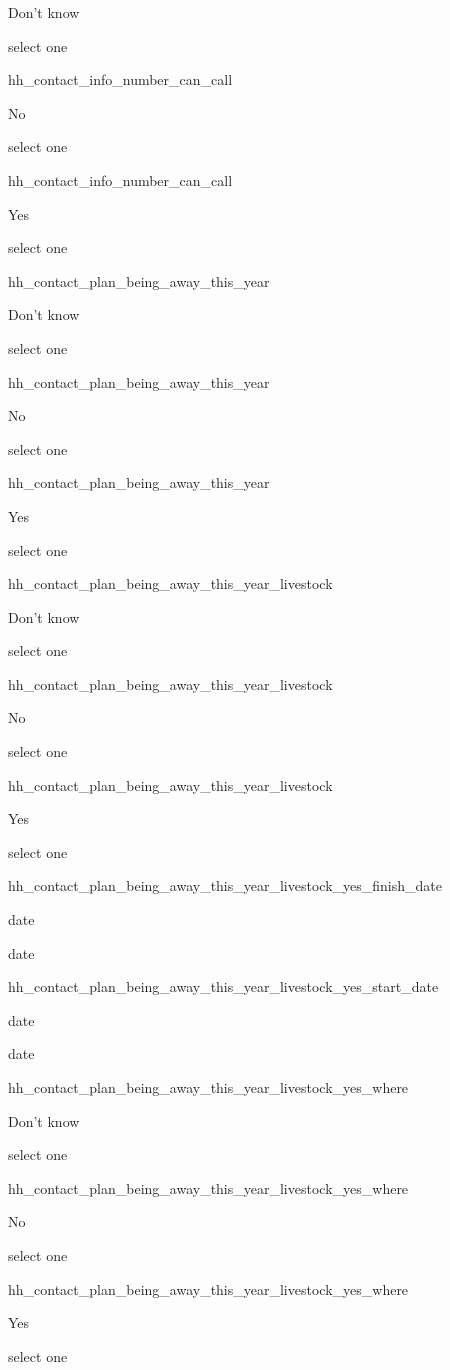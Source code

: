 \documentclass[]{article}
\begin{document}
Don't know

select one

hh\_contact\_info\_number\_can\_call

No

select one

hh\_contact\_info\_number\_can\_call

Yes

select one

hh\_contact\_plan\_being\_away\_this\_year

Don't know

select one

hh\_contact\_plan\_being\_away\_this\_year

No

select one

hh\_contact\_plan\_being\_away\_this\_year

Yes

select one

hh\_contact\_plan\_being\_away\_this\_year\_livestock

Don't know

select one

hh\_contact\_plan\_being\_away\_this\_year\_livestock

No

select one

hh\_contact\_plan\_being\_away\_this\_year\_livestock

Yes

select one

hh\_contact\_plan\_being\_away\_this\_year\_livestock\_yes\_finish\_date

date

date

hh\_contact\_plan\_being\_away\_this\_year\_livestock\_yes\_start\_date

date

date

hh\_contact\_plan\_being\_away\_this\_year\_livestock\_yes\_where

Don't know

select one

hh\_contact\_plan\_being\_away\_this\_year\_livestock\_yes\_where

No

select one

hh\_contact\_plan\_being\_away\_this\_year\_livestock\_yes\_where

Yes

select one
\end{document}
